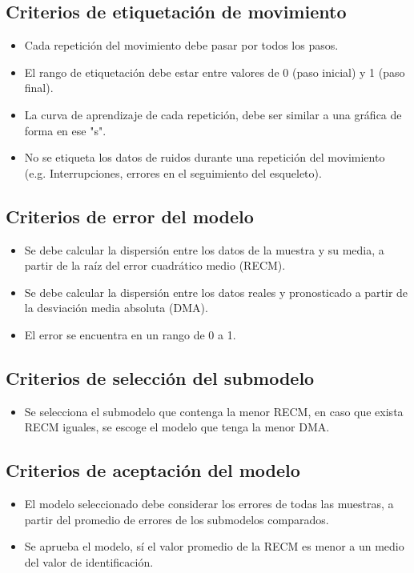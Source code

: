 \subsection{Criterios de etiquetaci\'on de movimiento}
\begin{itemize}
	\item Cada repetici\'on del movimiento debe pasar por todos los pasos.
	\item El rango de etiquetaci\'on debe estar entre valores de 0 (paso inicial) y 1 (paso final).
	\item La curva de aprendizaje de cada repetici\'on, debe ser similar a una gr\'afica de forma en ese "s".
	\item No se etiqueta los datos de ruidos durante una repetici\'on del movimiento (e.g. Interrupciones, errores en el seguimiento del esqueleto).
\end{itemize}
\subsection{Criterios de error del modelo}
\begin{itemize}
	\item Se debe calcular la dispersi\'on entre los datos de la muestra y su media, a partir de la ra\'iz del error cuadr\'atico medio (RECM).
	\item Se debe calcular la dispersi\'on entre los datos reales y pronosticado a partir de la desviaci\'on media absoluta (DMA). 
	\item El error se encuentra en un rango de 0 a 1.
\end{itemize}
\subsection{Criterios de selecci\'on del submodelo}
\begin{itemize}
	\item Se selecciona el submodelo que contenga la  menor RECM, en caso que exista RECM iguales, se escoge el modelo que tenga la menor DMA.
\end{itemize}
\subsection{Criterios de aceptaci\'on del modelo}
\begin{itemize}
	\item El modelo seleccionado debe considerar los errores de todas las muestras, a partir del promedio de errores de los submodelos comparados.
	\item Se aprueba el modelo, s\'i el valor promedio de la RECM es menor a un medio del valor de  identificaci\'on.
\end{itemize}
